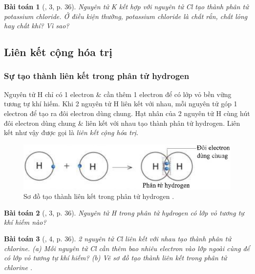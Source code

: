 \documentclass{article}
\newtheorem{baitoan}{Bài toán}
\begin{document}
\begin{baitoan}[\cite{SGK_KHTN_7_Canh_Dieu}, 3, p. 36]
	Nguyên tử \emph{K} kết hợp với nguyên tử \emph{Cl} tạo thành phân tử potassium chloride. Ở điều kiện thường, potassium chloride là chất rắn, chất lỏng hay chất khí? Vì sao?
\end{baitoan}

\subsection{Liên kết cộng hóa trị}

\subsubsection{Sự tạo thành liên kết trong phân tử hydrogen}
Nguyên tử H chỉ có 1 electron \& cần thêm 1 electron để có lớp vỏ bền vững tương tự khí hiếm. Khi 2 nguyên tử H liên kết với nhau, mỗi nguyên tử góp 1 electron để tạo ra đôi electron dùng chung. Hạt nhân của 2 nguyên tử H cùng hút đôi electron dùng chung \& liên kết với nhau tạo thành phân tử hydrogen. Liên kết như vậy được gọi là \textit{liên kết cộng hóa trị}.
\begin{figure}[H]
	\centering
	\includegraphics[scale=0.3]{hydrogen}
	\caption{Sơ đồ tạo thành liên kết trong phân tử hydrogen .}
\end{figure}

\begin{baitoan}[\cite{SGK_KHTN_7_Canh_Dieu}, 3, p. 36]
	Nguyên tử \emph{H} trong phân tử hydrogen \emph{} có lớp vỏ tương tự khí hiếm nào?
\end{baitoan}

\begin{baitoan}[\cite{SGK_KHTN_7_Canh_Dieu}, 4, p. 36]
	2 nguyên tử \emph{Cl} liên kết với nhau tạo thành phân tử chlorine. (a) Mỗi nguyên tử \emph{Cl} cần thêm bao nhiêu electron vào lớp ngoài cùng để có lớp vỏ tương tự khí hiếm? (b) Vẽ sơ đồ tạo thành liên kết trong phân tử chlorine \emph{}.
\end{baitoan}
\end{document}

